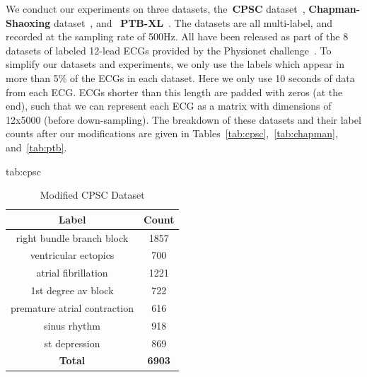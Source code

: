 \documentclass[pmlr,twocolumn]{jmlr}%
\begin{document}
We conduct our experiments on three datasets, the~\textbf{CPSC} dataset~\cite{liu2018open}, \textbf{Chapman-Shaoxing} dataset~\cite{zheng202012}, and ~\textbf{PTB-XL}~\cite{wagner2020ptb}. The datasets are all multi-label, and recorded at the sampling rate of 500Hz. All have been released as part of the 8 datasets of labeled 12-lead ECGs provided by the Physionet challenge~\cite{reyna2021will,reyna4issues}.
To simplify our datasets and experiments, we only use the labels which appear in more than 5\% of the ECGs in each dataset. Here we only use 10 seconds of data from each ECG. ECGs shorter than this length are padded with zeros (at the end), such that we can represent each ECG as a matrix with dimensions of 12x5000 (before down-sampling).
The breakdown of these datasets and their label counts after our modifications are given in Tables~\ref{tab:cpsc},~\ref{tab:chapman}, and~\ref{tab:ptb}.
\begin{table}[tbp]
\floatconts
  {tab:cpsc}%
  {\caption{Modified CPSC Dataset}}%
  {
\begin{tabular}{|c|c|}
 \hline
Label & Count \\
 \hline
right bundle branch block    &  1857 \\
ventricular ectopics         &   700 \\
atrial fibrillation          &  1221 \\
1st degree av block          &   722 \\
premature atrial contraction &   616 \\
sinus rhythm                 &   918 \\
st depression                &   869 \\
 \hline
\textbf{Total} & \textbf{6903}\\
\hline
\end{tabular}
  }
\end{table}
\end{document}
